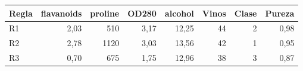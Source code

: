 \begin{tabular}{lrrrrrrr}
\toprule
Regla & flavanoids & proline & OD280 & alcohol & Vinos & Clase & Pureza \\
\midrule
R1 & 2,03 & 510 & 3,17 & 12,25 & 44 & 2 & 0,98 \\
R2 & 2,78 & 1120 & 3,03 & 13,56 & 42 & 1 & 0,95 \\
R3 & 0,70 & 675 & 1,75 & 12,96 & 38 & 3 & 0,87 \\
\bottomrule
\end{tabular}
